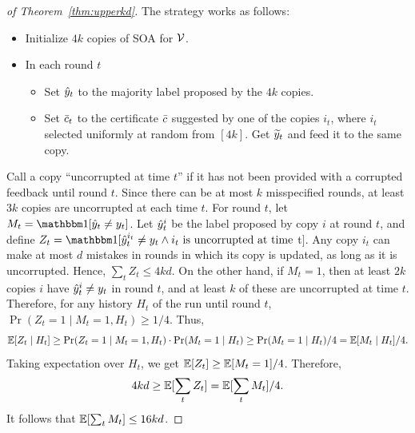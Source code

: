 \documentclass[anon]{alt2027} %
\begin{document}
\begin{proof}[of Theorem~\ref{thm:upperkd}]
The strategy works as follows: 
\begin{itemize}
    \item Initialize $4k$ copies of SOA for $\V$.
    \item In each round $t$
    \begin{itemize}
        \item Set $\hy_t$ to the majority label proposed by the $4k$ copies.
        \item Set $\sc_t$ to the certificate $\sc$ suggested by one of the copies $i_t$, where $i_t$ selected uniformly at random from $[4k]$. Get $\vy_t$ and feed it to the same copy.
    \end{itemize}
\end{itemize}
Call a copy ``uncorrupted at time $t$'' if it has not been provided with a corrupted feedback until round $t$. Since there can be at most $k$ misspecified rounds, at least $3k$ copies are uncorrupted at each time $t$. For round $t$, let $M_t = \indct[\hy_t \neq y_t]$. Let $\hy_t^i$ be the label proposed by copy $i$ at round $t$, and define $Z_t = \indct[\hy_t^{i_t} \neq y_t \wedge i_t \text{ is uncorrupted at time }$t$]$. Any copy $i_t$ can make at most $d$ mistakes in rounds in which its copy is updated, as long as it is uncorrupted. Hence, $\sum_t Z_t \leq 4kd$. On the other hand, if $M_t = 1$, then at least $2k$ copies $i$ have $\hy_t^{i} \neq y_t$ in round $t$, and at least $k$ of these are uncorrupted at time $t$. 
Therefore, for any history $H_t$ of the run until round $t$, $\Pr(Z_t = 1 \mid M_t = 1, H_t) \geq 1/4$. 
Thus,
\[
\ex[Z_t \mid H_t] \geq \Pr(Z_t = 1 \mid M_t = 1, H_t)\cdot \Pr(M_t = 1 \mid H_t) \geq \Pr(M_t = 1 \mid H_t)/4 = \ex[M_t \mid H_t]/4.
\]
Taking expectation over $H_t$, we get $\ex[Z_t] \geq \ex[M_t = 1]/4$.
Therefore,
\[
4kd \geq \ex[\sum_t Z_t] = \ex[\sum_t M_t]/4.
\]
It follows that $\ex[\sum_t M_t] \leq 16kd$.
\end{proof}
\end{document}
